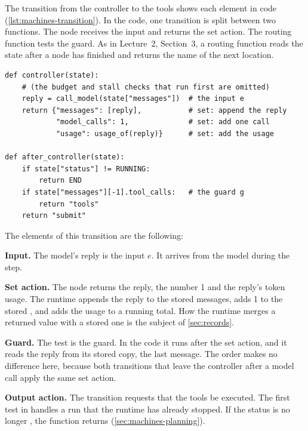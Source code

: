 The transition from the controller to the tools shows each element in code
(\cref{lst:machines-transition}). In the code, one transition is split between two functions. The
node  receives the input and returns the set action. The routing function
 tests the guard. As in Lecture~2, Section~3, a routing function reads the
state after a node has finished and returns the name of the next location.

\noindent\begin{minipage}{\linewidth}
\begin{lstlisting}[basicstyle=\ttfamily\footnotesize, caption={Illustrative code for the transition from the controller to the tools: the node receives the input and returns the set action, and the routing function tests the guard.}, label=lst:machines-transition]
def controller(state):
    # (the budget and stall checks that run first are omitted)
    reply = call_model(state["messages"])  # the input e
    return {"messages": [reply],           # set: append the reply
            "model_calls": 1,              # set: add one call
            "usage": usage_of(reply)}      # set: add the usage

def after_controller(state):
    if state["status"] != RUNNING:
        return END
    if state["messages"][-1].tool_calls:   # the guard g
        return "tools"
    return "submit"
\end{lstlisting}
\end{minipage}

The elements of this transition are the following:
\bi
\item \textbf{Input.} The model's reply is the input $e$. It arrives from the model during the step.
\item \textbf{Set action.} The node returns the reply, the number 1 and the reply's token usage. The
runtime appends the reply to the stored messages, adds 1 to the stored , and
adds the usage to a running total. How the runtime merges a returned value with a stored one is the
subject of \cref{sec:records}.
\item \textbf{Guard.} The test  is the guard. In the code
it runs after the set action, and it reads the reply from its stored copy, the last message. The
order makes no difference here, because both transitions that leave the controller after a model
call apply the same set action.
\item \textbf{Output action.} The transition requests that the tools be executed.
\ei
The first test in  handles a run that the runtime has already stopped.
If the status is no longer , the function returns 
(\cref{sec:machines-planning}).

